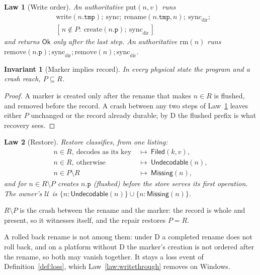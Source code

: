 \documentclass[journal]{IEEEtran}
\newtheorem{law}{Law}
\newtheorem{invariant}{Invariant}
\newcommand{\Ok}{\mathsf{Ok}}
\newcommand{\Filed}{\mathsf{Filed}}
\newcommand{\Undec}{\mathsf{Undecodable}}
\newcommand{\Missing}{\mathsf{Missing}}
\newcommand{\U}{\mathcal{U}}
\begin{document}
\begin{law}[Write order]\label{law:writeorder}
An authoritative $\mathrm{put}(n,v)$ runs
\begin{align*}
&\mathrm{write}(n.\mathtt{tmp});\ \mathrm{sync};\ \mathrm{rename}(n.\mathtt{tmp},n);\
\mathrm{sync}_{\mathrm{dir}};\\
&[\,n\notin P:\ \mathrm{create}(n.\mathtt{p});\ \mathrm{sync}_{\mathrm{dir}}\,]
\end{align*}
and returns $\Ok$ only after the last step.  An authoritative $\mathrm{rm}(n)$ runs
$\mathrm{remove}(n.\mathtt{p});\mathrm{sync}_{\mathrm{dir}};\mathrm{remove}(n);
\mathrm{sync}_{\mathrm{dir}}$.
\end{law}

\begin{invariant}[Marker implies record]\label{inv:marker}
In every physical state the program and a crash reach, $P\subseteq R$.
\end{invariant}
\begin{proof}
A marker is created only after the rename that makes $n\in R$ is flushed, and removed
before the record.  A crash between any two steps of Law~\ref{law:writeorder} leaves either
$P$ unchanged or the record already durable; by D the flushed prefix is what recovery sees.
\end{proof}

\begin{law}[Restore]\label{law:restore}
Restore classifies, from one listing:
\begin{align*}
n\in R,\ \text{decodes as its key} &\ \mapsto\ \Filed(k,v),\\
n\in R,\ \text{otherwise} &\ \mapsto\ \Undec(n),\\
n\in P\setminus R &\ \mapsto\ \Missing(n),
\end{align*}
and for $n\in R\setminus P$ creates $n.\mathtt{p}$ (flushed) before the store serves its
first operation.  The owner's $\U$ is $\{n:\Undec(n)\}\cup\{n:\Missing(n)\}$.
\end{law}

$R\setminus P$ is the crash between the rename and the marker: the record is whole and
present, so it witnesses itself, and the repair restores $P=R$.

A rolled back rename is not among them: under D a completed rename does not roll back, and
on a platform without D the marker's creation is not ordered after the rename, so both may
vanish together.  It stays a loss event of Definition~\ref{def:loss}, which
Law~\ref{law:writethrough} removes on Windows.
\end{document}
